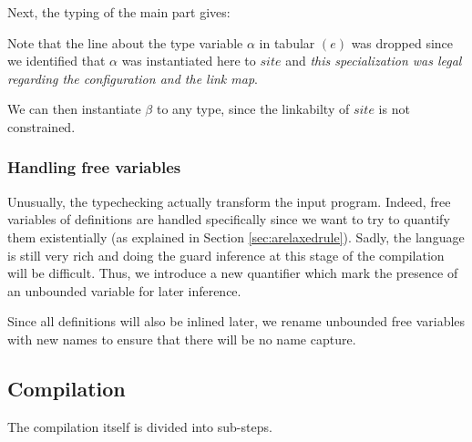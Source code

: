 \documentclass[10pt,a4paper]{article}
\begin{document}
Next, the typing of the main part gives:
\begin{figure}[H]
  \centering
  \quad\quad
  \quad\quad
\end{figure}

Note that the line about the type variable $\alpha$ in tabular $(e)$ was dropped since we identified that $\alpha$ was instantiated here to $site$ and \emph{this specialization was legal regarding the configuration and the link map}.

We can then instantiate $\beta$ to any type, since the linkabilty of $site$ is not constrained.

\subsubsection{Handling free variables}
Unusually, the typechecking actually transform the input program. Indeed, free variables of definitions are handled specifically since we want to try to quantify them existentially (as explained in Section \ref{sec:arelaxedrule}). Sadly, the language is still very rich and doing the guard inference at this stage of the compilation will be difficult. Thus, we introduce a new quantifier which mark the presence of an unbounded variable for later inference.

Since all definitions will also be inlined later, we rename unbounded free variables with new names to ensure that there will be no name capture.

\subsection{Compilation}
The compilation itself is divided into sub-steps.
\end{document}
